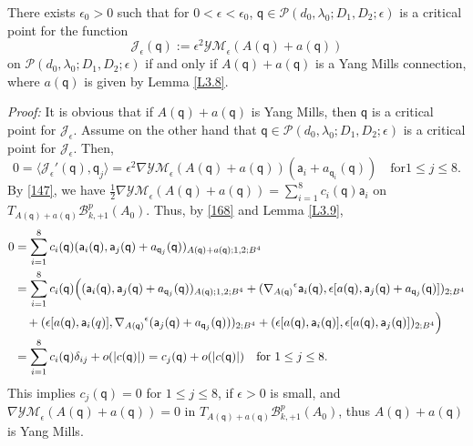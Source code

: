 \documentclass[11pt]{article}
\numberwithin{equation}{section} \setlength{\topmargin}{-35pt}
\newcommand{\PP}{\mathcal{P}}
\newcommand{\YMe}{\mathcal{YM}_{\epsilon}}
\newcommand{\q}{\mathsf{q}}
\newcommand{\A}{\mathsf{a}}
\newcommand{\Je}{\mathcal{J}_{\epsilon}}
\begin{document}
\begin{proposition}
\label{P3.2} There exists $\epsilon_0>0$ such that for
$0<\epsilon<\epsilon_0$, $\q\in\PP(d_0,\lambda_0;D_1,D_2;\epsilon)$
is a critical point for the function
$$\Je(\q):=\epsilon^2\YMe(A(\q)+a(\q))$$
on $\PP(d_0,\lambda_0;D_1,D_2;\epsilon)$ if and only if
$A(\q)+a(\q)$ is a Yang Mills connection, where $a(\q)$ is given by
Lemma \ref{L3.8}.
\end{proposition}
\textit{Proof:} It is obvious that if $A(\q)+a(\q)$ is Yang Mills,
then $\q$ is a critical point for $\Je$. Assume on the other hand
that $\q\in\PP(d_0,\lambda_0;D_1,D_2;\epsilon)$ is a critical point
for $\Je$. Then,
\begin{equation}
\label{168} 0=\langle\Je'(\q),\q_j\rangle
=\epsilon^2\nabla\YMe(A(\q)+a(\q))(\A_i+a_{\q_i}(\q))\quad\text{for
$1\le j\le 8$}.
\end{equation}
By \eqref{147}, we have
$\frac{1}{2}\nabla\YMe(A(\q)+a(\q))=\sum_{i=1}^8c_i(\q)\A_i$ on
$T_{A(\q)+a(\q)}\mathcal{B}^p_{k,+1}(A_0)$.  Thus, by \eqref{168}
and Lemma \ref{L3.9},
\begin{align}
\label{171}
 0&=\sum_{i=1}^8c_i(\q)(\A_i(\q),\A_j(\q)+a_{\q_j}(\q))_{A(\q)+a(\q);1,2;B^4}\notag\\
 &=\sum_{i=1}^8c_i(\q)\Big((\A_i(\q),\A_j(\q)+a_{\q_j}(\q))_{A(\q);1,2;B^4}+
({\nabla_{A(\q)}}^{\epsilon}\A_i(\q),\epsilon[a(\q),\A_j(\q)+a_{\q_j}(\q)])_{2;B^4}
\notag\\
&\quad+(\epsilon[a(\q),\A_i(q)],{\nabla_{A(\q)}}^{\epsilon}(\A_j(\q)+a_{\q_j}(\q)))_{2;B^4}+
(\epsilon[a(\q),\A_i(\q)],\epsilon[a(\q),\A_j(\q)])_{2;B^4}\Big)\notag\\
&=\sum_{i=1}^8c_i(\q)\delta_{ij}+o(|c(\q)|)
=c_j(\q)+o(|c(\q)|)\quad\text{for $1\le j\le 8$}.\notag\\
\end{align}
This implies $c_j(\q)=0$ for $1\le j\le 8$, if $\epsilon>0$ is
small, and $\nabla\YMe(A(\q)+a(\q))=0$ in
$T_{A(\q)+a(\q)}\mathcal{B}^p_{k,+1}(A_0)$, thus $A(\q)+a(\q)$ is
Yang Mills.
\end{document}
